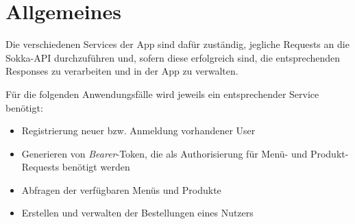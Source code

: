 \section{Allgemeines}

Die verschiedenen Services der App sind dafür zuständig, jegliche Requests an die Sokka-API
durchzuführen und, sofern diese erfolgreich sind, die entsprechenden Responses zu verarbeiten 
und in der App zu verwalten.

Für die folgenden Anwendungsfälle wird jeweils ein entsprechender Service benötigt:

\begin{itemize}
    \item Registrierung neuer bzw. Anmeldung vorhandener User
    \item Generieren von \textit{Bearer}-Token, die als Authorisierung
        für Menü- und Produkt-Requests benötigt werden
    \item Abfragen der verfügbaren Menüs und Produkte
    \item Erstellen und verwalten der Bestellungen eines Nutzers
\end{itemize}